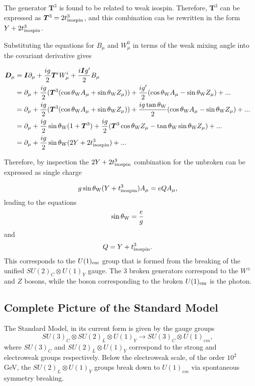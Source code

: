 \documentclass{article}
\begin{document}
The generator $\bm{T}^3$ is found to be related to weak isospin. Therefore, $\bm{T}^3$ can be expressed as $\bm{T}^3 = 2t^{3}_{\rm{isospin}}$, and this combination can be rewritten in the form $Y + 2t^{3}_{\rm{isospin}}$.

Substituting the equations for $B_\mu$ and $W^{0}_\mu$ in terms of the weak mixing angle into the covariant derivative gives 

\begin{equation}
\begin{split}
\bm{D}_\mu  & = \bm{I}\partial_\mu  + \frac{ig}{2}\bm{T}^iW^{i}_\mu + \frac{i\bm{I}g'}{2}B_\mu \\
& = \partial_\mu + \frac{ig}{2}(\bm{T}^3 (\cos\theta_{\rm{W}} A_\mu + \sin\theta_{\rm{W}}Z_\mu) ) + \frac{ig'}{2}(\cos\theta_{\rm{W}} A_\mu - \sin\theta_{\rm{W}}Z_\mu) + ... \\
& = \partial_\mu + \frac{ig}{2}(\bm{T}^3 (\cos\theta_{\rm{W}} A_\mu + \sin\theta_{\rm{W}}Z_\mu) )+ \frac{ig\tan\theta_{\rm{W}}}{2}(\cos\theta_{\rm{W}} A_\mu - \sin\theta_{\rm{W}}Z_\mu) + ...\\
& = \partial_\mu + \frac{ig}{2}\sin\theta_{\rm{W}}(1+\bm{T}^3) + \frac{ig}{2}(\bm{T}^3 \cos\theta_{\rm{W}} Z_\mu - \tan\theta_{\rm{W}}\sin\theta_{\rm{W}}Z_\mu)+...\\
& = \partial_\mu + \frac{ig}{2}\sin\theta_{\rm{W}}(2Y+2t^{3}_{\rm{isospin}}) + ...
\end{split}
\end{equation}

Therefore, by inspection the $2Y+2t^{3}_{\rm{isospin}}$ combination for the unbroken can be expressed as single charge

\begin{equation}
g\sin\theta_{\rm{W}}(Y+t^{3}_{\rm{isospin}})A_\mu = eQA_\mu,
\end{equation}
leading to the equations
\begin{equation}
\sin\theta_{\rm{W}} = \frac{e}{g}
\end{equation}
and
\begin{equation}
\label{eqn:chargeIsospin}
Q = Y +t^{3}_{\rm{isospin}}.
\end{equation}
This corresponds to the $U(1)_{\rm{em}}$ group that is formed from the breaking of the unified $SU(2)_C \otimes U(1)_Y$ gauge. The 3 broken generators correspond to the $W^{\pm}$ and $Z$ bosons, while the boson corresponding to the broken $U(1)_{\rm{em}}$ is the photon.
\subsection{Complete Picture of the Standard Model}%
\label{sec:SM_SM}
The Standard Model, in its current form is given by the gauge groups 
\begin{equation}
    SU(3)_C \otimes SU(2)_L \otimes U(1)_Y \rightarrow SU(3)_C \otimes U(1)_{em},
\end{equation}
where $SU(3)_C$ and $SU(2)_L \otimes U(1)_Y$ correspond to the strong and electroweak groups respectively. Below the electroweak scale, of the order $10^{2}\,$GeV, the $SU(2)_L \otimes U(1)_Y$ groups break down to $U(1)_{em}$ via spontaneous symmetry breaking.
\end{document}
